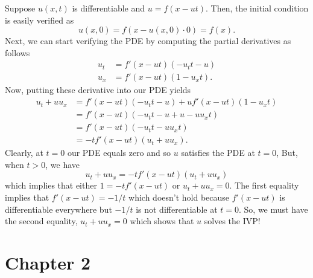 \documentclass[a4paper,12pt]{article}
\begin{document}
    Suppose $ u(x,t) $ is differentiable and $ u = f(x - ut) $. Then, the initial condition is easily verified as
    \[
    	u(x,0) = f(x - u(x,0) \cdot 0) = f(x).
    \]
    Next, we can start verifying the PDE by computing the partial derivatives as follows
    \begin{align*}
        u_t  &= f'(x - u t) (-u_t t - u) \\
        u_x &= f'(x - ut) (1 - u_x t).
    \end{align*}
    Now, putting these derivative into our PDE yields
    \begin{align*}
        u_t + u u_x &= f'(x - u t) (-u_t t - u) + u f'(x - ut) (1 - u_x t) \\
        &= f'(x - ut) (-u_t t - u + u - u u_x t) \\
        &= f'(x - ut) (-u_t t - u u_x t) \\
        &= -t f'(x - ut) (u_t + u u_x).
    \end{align*}
Clearly, at $ t = 0 $ our PDE equals zero and so $ u $ satisfies the PDE at $ t = 0 $, But, when $ t > 0 $, we have
\[
    u_t + u u_x = -t f'(x - ut) (u_t + u u_x)
\]
which implies that either $ 1 = -t f'(x - ut)  $ or $ u_t + u u_x = 0 $. The first equality implies that $ f'(x - ut) = -1/t $ which doesn't hold because $ f'(x - ut) $ is differentiable everywhere but $ - 1/t $ is not differentiable at $ t = 0 $. So, we must have the second equality, $ u_t + u u_x = 0 $ which shows that $ u $ solves the IVP!

\section*{Chapter 2}
\end{document}
